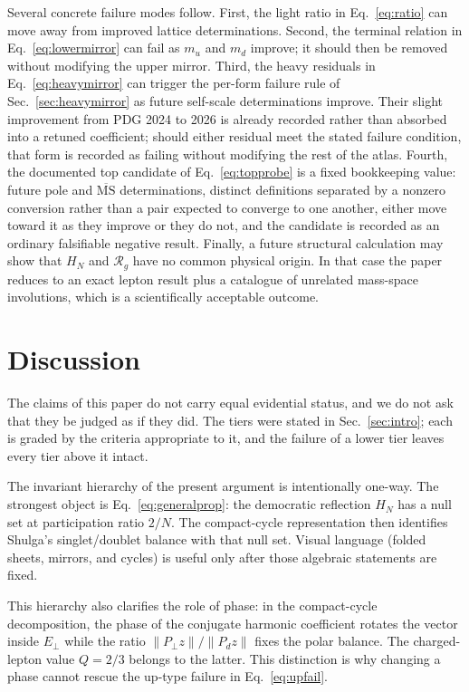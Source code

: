 \documentclass[aps,twocolumn,superscriptaddress,nofootinbib,floatfix]{revtex4-2}
\newcommand{\MSbar}{\overline{\mathrm{MS}}}
\newcommand{\RR}{\mathcal R}
\begin{document}
Several concrete failure modes follow. First, the light ratio in Eq.~\eqref{eq:ratio} can move away from improved lattice determinations. Second, the terminal relation in Eq.~\eqref{eq:lowermirror} can fail as $m_u$ and $m_d$ improve; it should then be removed without modifying the upper mirror. Third, the heavy residuals in Eq.~\eqref{eq:heavymirror} can trigger the per-form failure rule of Sec.~\ref{sec:heavymirror} as future self-scale determinations improve. Their slight improvement from PDG 2024 to 2026 is already recorded rather than absorbed into a retuned coefficient; should either residual meet the stated failure condition, that form is recorded as failing without modifying the rest of the atlas. Fourth, the documented top candidate of Eq.~\eqref{eq:topprobe} is a fixed bookkeeping value: future pole and $\MSbar$ determinations, distinct definitions separated by a nonzero conversion rather than a pair expected to converge to one another, either move toward it as they improve or they do not, and the candidate is recorded as an ordinary falsifiable negative result. Finally, a future structural calculation may show that $H_N$ and $\RR_g$ have no common physical origin. In that case the paper reduces to an exact lepton result plus a catalogue of unrelated mass-space involutions, which is a scientifically acceptable outcome.

\section{Discussion}
\label{sec:discussion}

The claims of this paper do not carry equal evidential status, and we do not ask that they be judged as if they did. The tiers were stated in Sec.~\ref{sec:intro}; each is graded by the criteria appropriate to it, and the failure of a lower tier leaves every tier above it intact.

The invariant hierarchy of the present argument is intentionally one-way. The strongest object is Eq.~\eqref{eq:generalprop}: the democratic reflection $H_N$ has a null set at participation ratio $2/N$. The compact-cycle representation then identifies Shulga's singlet/doublet balance with that null set. Visual language (folded sheets, mirrors, and cycles) is useful only after those algebraic statements are fixed.

This hierarchy also clarifies the role of phase: in the compact-cycle decomposition, the phase of the conjugate harmonic coefficient rotates the vector inside $E_\perp$ while the ratio $\|P_\perp z\|/\|P_dz\|$ fixes the polar balance. The charged-lepton value $Q=2/3$ belongs to the latter. This distinction is why changing a phase cannot rescue the up-type failure in Eq.~\eqref{eq:upfail}.
\end{document}
